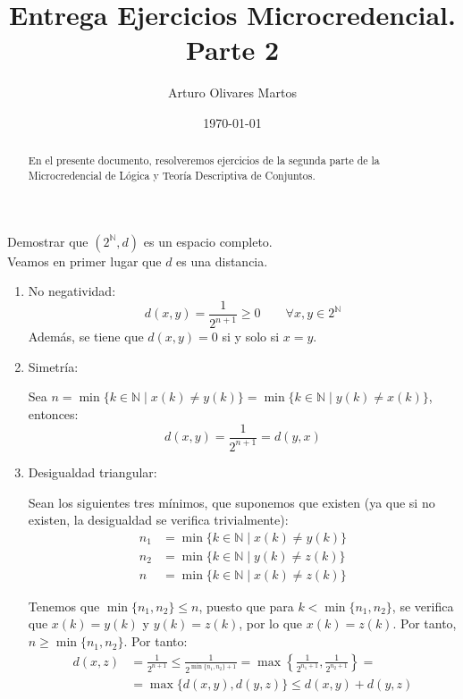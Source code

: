 \documentclass[12pt]{article}
\author{Arturo Olivares Martos}
\date{\today}
\title{Entrega Ejercicios Microcredencial. Parte 2}
\begin{document}
    \maketitle
    \begin{abstract}
        En el presente documento, resolveremos ejercicios de la segunda parte de la Microcredencial de Lógica y Teoría Descriptiva de Conjuntos.
    \end{abstract}

    \begin{ejercicio}
    Demostrar que $(2^\mathbb{N}, d)$ es un espacio completo. \\

    Veamos en primer lugar que $d$ es una distancia.
    \begin{enumerate}
        \item No negatividad:
            \begin{equation*}
                d(x,y) = \frac{1}{2^{n+1}} \geq 0 \qquad \forall x,y\in 2^\mathbb{N}
            \end{equation*}
            Además, se tiene que $d(x,y) = 0$ si y solo si $x = y$.

        \item Simetría:
        
            Sea $n=\min\{k\in \mathbb{N} \mid x(k) \neq y(k)\}=\min\{k\in \mathbb{N} \mid y(k) \neq x(k)\}$, entonces:
            \begin{equation*}
                d(x,y) = \frac{1}{2^{n+1}} = d(y,x)
            \end{equation*}

        \item Desigualdad triangular:
        
            Sean los siguientes tres mínimos, que suponemos que existen (ya que si no existen, la desigualdad se verifica trivialmente):
            \begin{align*}
                n_1 &= \min\{k\in \mathbb{N} \mid x(k) \neq y(k)\} \\
                n_2 &= \min\{k\in \mathbb{N} \mid y(k) \neq z(k)\} \\
                n &= \min\{k\in \mathbb{N} \mid x(k) \neq z(k)\}
            \end{align*}

            Tenemos que $\min\{n_1,n_2\} \leq n$, puesto que para $k<\min\{n_1,n_2\}$, se verifica que $x(k) = y(k)$ y $y(k) = z(k)$, por lo que $x(k) = z(k)$. Por tanto, $n\geq \min\{n_1,n_2\}$. Por tanto:
            \begin{align*}
                d(x,z) &= \frac{1}{2^{n+1}} \leq \frac{1}{2^{\min\{n_1,n_2\}+1}} = \max\left\{\frac{1}{2^{n_1+1}},\frac{1}{2^{n_2+1}}\right\} =\\&= \max\{d(x,y),d(y,z)\}\leq d(x,y) + d(y,z)
            \end{align*}
    \end{enumerate}


\end{ejercicio}
\end{document}
